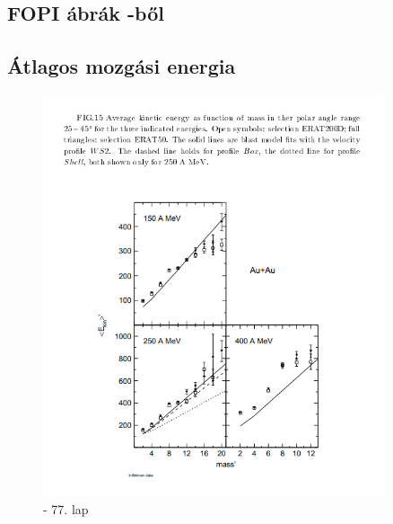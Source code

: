 \documentclass[a4paper,12pt]{article}
\begin{document}
\begin{appendices}
\section{FOPI ábrák \cite{REISDORF1997493}-ből}
\subsection{Átlagos mozgási energia}
\begin{figure}[H]
\centering
\includegraphics[width=0.9\textwidth]{./avgkin.png}
\caption{\cite{REISDORF1997493} - 77. lap}
\end{figure}

\end{appendices}
\end{document}
